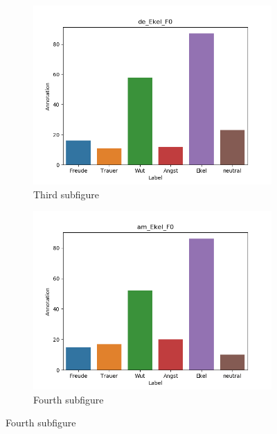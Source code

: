 \documentclass[11pt,a4paper,headsepline,twoside,toc=bibliography]{scrreprt}
\begin{document}
\begin{figure}[t!]
	\medskip
	\begin{subfigure}{0.48\textwidth}
		\includegraphics[width=\linewidth]{plots/de_Ekel_F0.png}
		\caption{Third subfigure} \label{fig:de_E_F0}
	\end{subfigure}\hspace*{\fill}
	\begin{subfigure}{0.48\textwidth}
		\includegraphics[width=\linewidth]{plots/am_Ekel_F0.png}
		\caption{Fourth subfigure} \label{fig:am_E_F0}
	\end{subfigure}
	

\end{figure}
\end{document}
